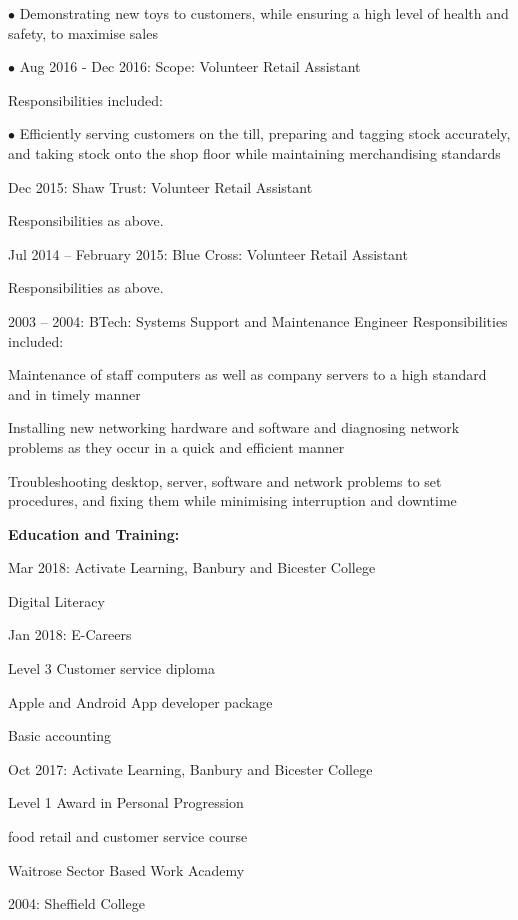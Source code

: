 \documentclass[12pt,a4paper]{book}
\begin{document}
\begin{flushleft}
  \item[$\bullet$]Demonstrating new toys to customers, while ensuring a high level of
  health and safety, to maximise sales
\linebreak{}
  \item[$\bullet$]Aug 2016 - Dec 2016: Scope: Volunteer Retail Assistant

Responsibilities included:

  \item[$\bullet$]Efficiently serving customers on the till, preparing and tagging stock
  accurately, and taking stock onto the shop floor while maintaining
  merchandising standards

  Dec 2015: Shaw Trust: Volunteer Retail Assistant

Responsibilities as above.

  Jul 2014 -- February 2015: Blue Cross: Volunteer Retail Assistant

Responsibilities as above.

2003 -- 2004: BTech: Systems Support and Maintenance Engineer
Responsibilities included:

  Maintenance of staff computers as well as company servers to a high
  standard and in timely manner

  Installing new networking hardware and software and diagnosing network
  problems as they occur in a quick and efficient manner

  Troubleshooting desktop, server, software and network problems to set
  procedures, and fixing them while minimising interruption and downtime

\textbf {Education and Training:}

  Mar 2018: Activate Learning, Banbury and Bicester College

    Digital Literacy

  Jan 2018: E-Careers

    Level 3 Customer service diploma

    Apple and Android App developer package

    Basic accounting

  Oct 2017: Activate Learning, Banbury and Bicester College

    Level 1 Award in Personal Progression

    food retail and customer service course

    Waitrose Sector Based Work Academy

  2004: Sheffield College


\end{flushleft}
\end{document}

